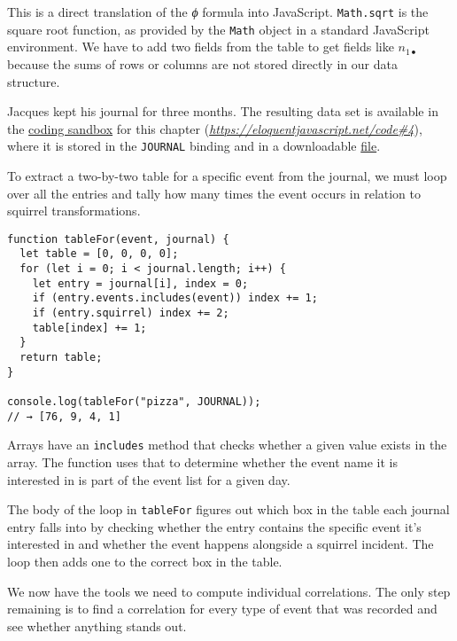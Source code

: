 This is a direct translation of the \emph{ϕ} formula into JavaScript. \lstinline`Math.sqrt` is the square root function, as provided by the \lstinline`Math` object in a standard JavaScript environment. We have to add two fields from the table to get fields like $n_{1\bullet}$ because the sums of rows or columns are not stored directly in our data structure.

Jacques kept his journal for three months. The resulting data set is available in the \href{https://eloquentjavascript.net/code#4}{coding sandbox} for this chapter (\href{https://eloquentjavascript.net/code#4}{\emph{https://eloquentjavascript.net\slash code\#4}}), where it is stored in the \lstinline`JOURNAL` binding and in a downloadable \href{https://eloquentjavascript.net/code/journal.js}{file}.

To extract a two-by-two table for a specific event from the journal, we must loop over all the entries and tally how many times the event occurs in relation to squirrel transformations.

\begin{lstlisting}
function tableFor(event, journal) {
  let table = [0, 0, 0, 0];
  for (let i = 0; i < journal.length; i++) {
    let entry = journal[i], index = 0;
    if (entry.events.includes(event)) index += 1;
    if (entry.squirrel) index += 2;
    table[index] += 1;
  }
  return table;
}

console.log(tableFor("pizza", JOURNAL));
// → [76, 9, 4, 1]
\end{lstlisting}
\noindent{}

Arrays have an \lstinline`includes` method that checks whether a given value exists in the array. The function uses that to determine whether the event name it is interested in is part of the event list for a given day.

The body of the loop in \lstinline`tableFor` figures out which box in the table each journal entry falls into by checking whether the entry contains the specific event it's interested in and whether the event happens alongside a squirrel incident. The loop then adds one to the correct box in the table.

We now have the tools we need to compute individual correlations. The only step remaining is to find a correlation for every type of event that was recorded and see whether anything stands out.

